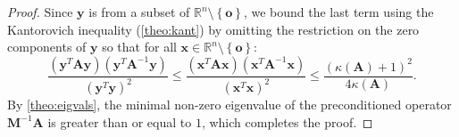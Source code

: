 \documentclass[10pt,a4paper]{amsart}
\newcommand{\MA}{\bm{A}}
\newcommand{\MM}{\bm{M}}
\newcommand{\Vo}{\bm{o}}
\newcommand{\Vx}{\bm{x}}
\newcommand{\Vy}{\bm{y}}
\begin{document}
\begin{proof}
  Since $\Vy$ is from a subset of $\mathbb{R}^{n}\setminus\left\{\Vo\right\}$, we bound the last term using the Kantorovich inequality (\cref{theo:kant}) by omitting the restriction on the zero components of $\Vy$ so that for all $\Vx \in \mathbb{R}^{n} \setminus\left\{\Vo\right\}$:
  \begin{equation*}
    \frac{\left(\Vy^{T}\MA\Vy\right) \left(\Vy^{T}\MA^{-1}\Vy\right)}{\left(\Vy^{T}\Vy\right)^{2}}
    \leq \frac{\left(\Vx^{T}\MA\Vx\right) \left(\Vx^{T}\MA^{-1}\Vx\right)}{\left(\Vx^{T}\Vx\right)^{2}}
    \leq \frac{\left( \kappa\left( \MA \right) +1 \right)^{2}}{4\kappa(\MA)}.
  \end{equation*}
  By \cref{theo:eigvals}, the minimal non-zero eigenvalue of the preconditioned operator $\MM^{-1}\MA$ is greater than or equal to $1$, which completes the proof.
\end{proof}
\end{document}
